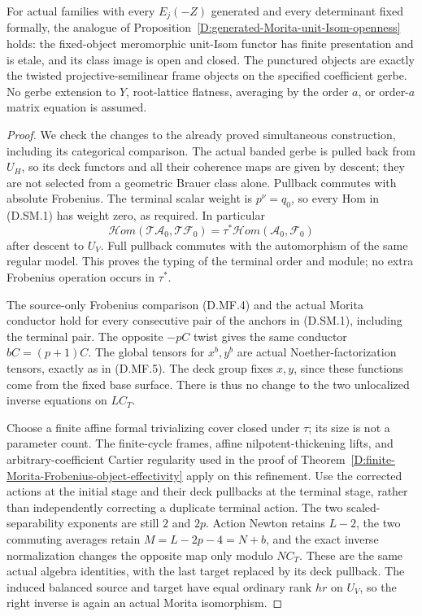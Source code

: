 \begin{lemma}
For actual families with every $E_j(-Z)$ generated and
every determinant fixed formally, the analogue of
Proposition~\ref{D:generated-Morita-unit-Isom-openness}
holds: the fixed-object meromorphic unit-Isom functor has
finite presentation and is etale, and its class image is
open and closed. The punctured objects are exactly the
twisted projective-semilinear frame objects on the specified
coefficient gerbe. No gerbe extension to $Y$, root-lattice
flatness, averaging by the order $a$, or order-$a$ matrix
equation is assumed.
\end{lemma}

\begin{proof}
We check the changes to the already proved simultaneous
construction, including its categorical comparison.
The actual banded gerbe is pulled back from $U_H$, so
its deck functors and all their coherence maps are given
by descent; they are not selected from a geometric Brauer
class alone. Pullback commutes with absolute Frobenius.
The terminal scalar weight is $p^\nu=q_0$, so every Hom
in (D.SM.1) has weight zero, as required.
In particular
\[
 \mathcal Hom(\mathscr T\mathcal A_0,\mathscr T\mathcal F_0)
       =\tau^*\mathcal Hom(\mathcal A_0,\mathcal F_0)
                                                        \tag{D.SM.3}
\]
after descent to $U_V$. Full pullback commutes with the
automorphism of the same regular model. This proves the
typing of the terminal order and module; no extra
Frobenius operation occurs in $\tau^*$.

The source-only Frobenius comparison (D.MF.4) and the
actual Morita conductor hold for every consecutive pair
of the anchors in (D.SM.1), including the terminal pair.
The opposite $-pC$ twist gives the same conductor
$bC=(p+1)C$. The global tensors for $x^b,y^b$ are actual
Noether-factorization tensors, exactly as in (D.MF.5).
The deck group fixes $x,y$, since these functions come
from the fixed base surface. There is thus no change to
the two unlocalized inverse equations on $LC_T$.

Choose a finite affine formal trivializing cover closed
under $\tau$; its size is not a parameter count. The
finite-cycle frames, affine nilpotent-thickening lifts,
and arbitrary-coefficient Cartier regularity used in the
proof of Theorem~\ref{D:finite-Morita-Frobenius-object-effectivity}
apply on this refinement. Use the corrected actions at
the initial stage and their deck pullbacks at the terminal
stage, rather than independently correcting a duplicate
terminal action. The two scaled-separability exponents
are still $2$ and $2p$. Action Newton retains $L-2$,
the two commuting averages retain
$M=L-2p-4=N+b$, and the exact inverse normalization
changes the opposite map only modulo $NC_T$. These are
the same actual algebra identities, with the last target
replaced by its deck pullback. The induced balanced
source and target have equal ordinary rank $hr$ on
$U_V$, so the right inverse is again an actual Morita
isomorphism.


\end{proof}
